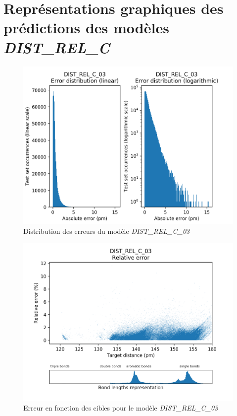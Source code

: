 \chapter{Représentations graphiques des prédictions des modèles \emph{DIST\_REL\_C}}

\begin{figure}[!h]
	\centering
	
	\includegraphics[scale=0.8]{../figures/DIST_REL_C_03/DIST_REL_C_03_distrib_rmse_val.png}	
	
	\caption{Distribution des erreurs du modèle \emph{DIST\_REL\_C\_03}}
\end{figure}
\begin{figure}[!h]
	\centering
	
	\includegraphics[scale=0.8]{../figures/DIST_REL_C_03/DIST_REL_C_03_distrib_rmse_dist.png}	
	
	\caption{Erreur en fonction des cibles pour le modèle \emph{DIST\_REL\_C\_03}}
	\end{figure}

